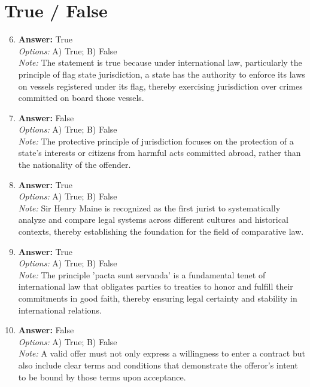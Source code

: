 \documentclass[12pt]{article}
\begin{document}
\section*{True / False}
\begin{enumerate}[label=\arabic*.]
\setcounter{enumi}{5}
\item \textbf{Answer:} True
\\ \textit{Options:} A) True; B) False
\\ \textit{Note:} The statement is true because under international law, particularly the principle of flag state jurisdiction, a state has the authority to enforce its laws on vessels registered under its flag, thereby exercising jurisdiction over crimes committed on board those vessels.
\item \textbf{Answer:} False
\\ \textit{Options:} A) True; B) False
\\ \textit{Note:} The protective principle of jurisdiction focuses on the protection of a state's interests or citizens from harmful acts committed abroad, rather than the nationality of the offender.
\item \textbf{Answer:} True
\\ \textit{Options:} A) True; B) False
\\ \textit{Note:} Sir Henry Maine is recognized as the first jurist to systematically analyze and compare legal systems across different cultures and historical contexts, thereby establishing the foundation for the field of comparative law.
\item \textbf{Answer:} True
\\ \textit{Options:} A) True; B) False
\\ \textit{Note:} The principle 'pacta sunt servanda' is a fundamental tenet of international law that obligates parties to treaties to honor and fulfill their commitments in good faith, thereby ensuring legal certainty and stability in international relations.
\item \textbf{Answer:} False
\\ \textit{Options:} A) True; B) False
\\ \textit{Note:} A valid offer must not only express a willingness to enter a contract but also include clear terms and conditions that demonstrate the offeror's intent to be bound by those terms upon acceptance.
\end{enumerate}
\end{document}
